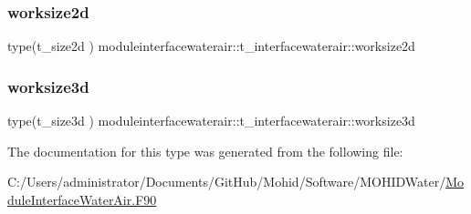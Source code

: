 \subsubsection{\texorpdfstring{worksize2d}{worksize2d}}
{\footnotesize\ttfamily type(t\+\_\+size2d ) moduleinterfacewaterair\+::t\+\_\+interfacewaterair\+::worksize2d\hspace{0.3cm}{\ttfamily [private]}}

\mbox{\label{structmoduleinterfacewaterair_1_1t__interfacewaterair_a00afa83ce20dbb4efa3c061989c3094c}} 
\subsubsection{\texorpdfstring{worksize3d}{worksize3d}}
{\footnotesize\ttfamily type(t\+\_\+size3d ) moduleinterfacewaterair\+::t\+\_\+interfacewaterair\+::worksize3d\hspace{0.3cm}{\ttfamily [private]}}



The documentation for this type was generated from the following file\+:\begin{DoxyCompactItemize}
\item 
C\+:/\+Users/administrator/\+Documents/\+Git\+Hub/\+Mohid/\+Software/\+M\+O\+H\+I\+D\+Water/\mbox{\hyperlink{_module_interface_water_air_8_f90}{Module\+Interface\+Water\+Air.\+F90}}\end{DoxyCompactItemize}
